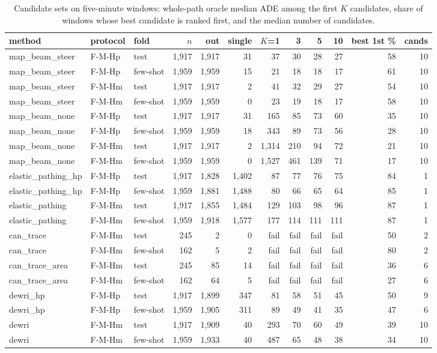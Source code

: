 \begin{table}[t]\centering\scriptsize\setlength{\tabcolsep}{3pt}
\caption{Candidate sets on five-minute windows: whole-path oracle median ADE among the first $K$ candidates, share of windows whose best candidate is ranked first, and the median number of candidates.}\label{tab:supp_topk}
\begin{tabular}{lllrrrrrrrrr}\toprule
method & protocol & fold & $n$ & out & single & $K$=1 & 3 & 5 & 10 & best 1st \% & cands \\\midrule
map\_beam\_steer & F-M-Hp & test & 1{,}917 & 1{,}917 & 31 & 37 & 30 & 28 & 27 & 58 & 10 \\
map\_beam\_steer & F-M-Hp & few-shot & 1{,}959 & 1{,}959 & 15 & 21 & 18 & 18 & 17 & 61 & 10 \\
map\_beam\_steer & F-M-Hm & test & 1{,}917 & 1{,}917 & 2 & 41 & 32 & 29 & 27 & 54 & 10 \\
map\_beam\_steer & F-M-Hm & few-shot & 1{,}959 & 1{,}959 & 0 & 23 & 19 & 18 & 17 & 58 & 10 \\
map\_beam\_none & F-M-Hp & test & 1{,}917 & 1{,}917 & 31 & 165 & 85 & 73 & 60 & 35 & 10 \\
map\_beam\_none & F-M-Hp & few-shot & 1{,}959 & 1{,}959 & 18 & 343 & 89 & 73 & 56 & 28 & 10 \\
map\_beam\_none & F-M-Hm & test & 1{,}917 & 1{,}917 & 2 & 1{,}314 & 210 & 94 & 72 & 21 & 10 \\
map\_beam\_none & F-M-Hm & few-shot & 1{,}959 & 1{,}959 & 0 & 1{,}527 & 461 & 139 & 71 & 17 & 10 \\
elastic\_pathing\_hp & F-M-Hp & test & 1{,}917 & 1{,}828 & 1{,}402 & 87 & 77 & 76 & 75 & 84 & 1 \\
elastic\_pathing\_hp & F-M-Hp & few-shot & 1{,}959 & 1{,}881 & 1{,}488 & 80 & 66 & 65 & 64 & 85 & 1 \\
elastic\_pathing & F-M-Hm & test & 1{,}917 & 1{,}855 & 1{,}484 & 129 & 103 & 98 & 96 & 87 & 1 \\
elastic\_pathing & F-M-Hm & few-shot & 1{,}959 & 1{,}918 & 1{,}577 & 177 & 114 & 111 & 111 & 87 & 1 \\
can\_trace & F-M-Hm & test & 245 & 2 & 0 & fail & fail & fail & fail & 50 & 2 \\
can\_trace & F-M-Hm & few-shot & 162 & 5 & 2 & fail & fail & fail & fail & 80 & 2 \\
can\_trace\_area & F-M-Hm & test & 245 & 85 & 14 & fail & fail & fail & fail & 36 & 6 \\
can\_trace\_area & F-M-Hm & few-shot & 162 & 64 & 5 & fail & fail & fail & fail & 27 & 6 \\
dewri\_hp & F-M-Hp & test & 1{,}917 & 1{,}899 & 347 & 81 & 58 & 51 & 45 & 50 & 9 \\
dewri\_hp & F-M-Hp & few-shot & 1{,}959 & 1{,}905 & 311 & 89 & 49 & 41 & 35 & 47 & 6 \\
dewri & F-M-Hm & test & 1{,}917 & 1{,}909 & 40 & 293 & 70 & 60 & 49 & 39 & 10 \\
dewri & F-M-Hm & few-shot & 1{,}959 & 1{,}933 & 40 & 487 & 65 & 48 & 38 & 34 & 10 \\
\bottomrule\end{tabular}
\end{table}
